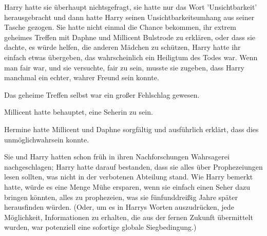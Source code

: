 Harry hatte sie überhaupt nichtsgefragt, sie hatte nur das Wort 'Unsichtbarkeit' herausgebracht und dann hatte Harry seinen Unsichtbarkeitsumhang aus seiner Tasche gezogen. Sie hatte nicht einmal die Chance bekommen, ihr extrem geheimes Treffen mit Daphne und Millicent Bulstrode zu erklären, oder dass sie dachte, es würde helfen, die anderen Mädchen zu schützen, Harry hatte ihr einfach etwas übergeben, das wahrscheinlich ein Heiligtum des Todes war. Wenn man fair war, und sie versuchte, fair zu sein, musste sie zugeben, dass Harry manchmal ein echter, wahrer Freund sein konnte.

Das geheime Treffen selbst war ein großer Fehlschlag gewesen.

Millicent hatte behauptet, eine Seherin zu sein.

Hermine hatte Millicent und Daphne sorgfältig und ausführlich erklärt, dass dies unmöglichwahrsein konnte.

Sie und Harry hatten schon früh in ihren Nachforschungen Wahrsagerei nachgeschlagen; Harry hatte darauf bestanden, dass sie alles über Prophezeiungen lesen sollten, was nicht in der verbotenen Abteilung stand. Wie Harry bemerkt hatte, würde es eine Menge Mühe ersparen, wenn sie einfach einen Seher dazu bringen könnten, alles zu prophezeien, was sie fünfunddreißig Jahre später herausfinden würden. (Oder, um es in Harrys Worten auszudrücken, jede Möglichkeit, Informationen zu erhalten, die aus der fernen Zukunft übermittelt wurden, war potenziell eine sofortige globale Siegbedingung.)

